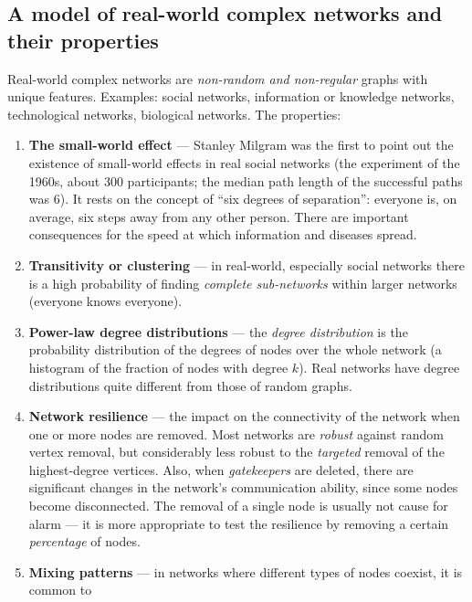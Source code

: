 \documentclass[11pt,a4paper]{article}
\theoremstyle{definition}
\providecommand{\uv}[1]{``#1''}
\begin{document}
\subsection{A model of real-world complex networks and their properties}

\begin{defbox}
Real-world complex networks are \emph{non-random and non-regular} graphs with unique features.
Examples: social networks, information or knowledge networks, technological networks, biological
networks. The properties:
\begin{enumerate}
\item \textbf{The small-world effect} --- Stanley Milgram was the first to point out the existence of
      small-world effects in real social networks (the experiment of the 1960s, about 300
      participants; the median path length of the successful paths was 6). It rests on the concept of
      \uv{six degrees of separation}: everyone is, on average, six steps away from any other person.
      There are important consequences for the speed at which information and diseases spread.
\item \textbf{Transitivity or clustering} --- in real-world, especially social networks there is a
      high probability of finding \emph{complete sub-networks} within larger networks (everyone knows
      everyone).
\item \textbf{Power-law degree distributions} --- the \emph{degree distribution} is the probability
      distribution of the degrees of nodes over the whole network (a histogram of the fraction of
      nodes with degree $k$). Real networks have degree distributions quite different from those of
      random graphs.
\item \textbf{Network resilience} --- the impact on the connectivity of the network when one or more
      nodes are removed. Most networks are \emph{robust} against random vertex removal, but
      considerably less robust to the \emph{targeted} removal of the highest-degree vertices. Also,
      when \emph{gatekeepers} are deleted, there are significant changes in the network's
      communication ability, since some nodes become disconnected. The removal of a single node is
      usually not cause for alarm --- it is more appropriate to test the resilience by removing a
      certain \emph{percentage} of nodes.
\item \textbf{Mixing patterns} --- in networks where different types of nodes coexist, it is common to

\end{enumerate}
\end{defbox}
\end{document}
